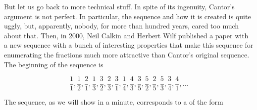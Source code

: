 \documentclass[tikz]{scrreprt}
\begin{document}
But let us go back to more technical stuff.
In spite of its ingenuity, Cantor's argument
is not perfect.
In particular, the sequence and how it is
created is quite uggly,
but, apparently, nobody, for more than hundred years,
cared too much about that. 
Then, in \num{2000}, Neil Calkin and Herbert Wilf
published a paper with a new sequence with 
a bunch of interesting properties that make
this sequence for enumerating the fractions
much more attractive than Cantor's original
sequence. The beginning of the sequence is

\[
 \frac{1}{1},
 \frac{1}{2}, 
 \frac{2}{1}, 
 \frac{1}{3}, 
 \frac{3}{2}, 
 \frac{2}{3}, 
 \frac{3}{1}, 
 \frac{1}{4}, 
 \frac{4}{3}, 
 \frac{3}{5}, 
 \frac{5}{2},
 \frac{2}{5},
 \frac{5}{3},
 \frac{3}{4},
 \frac{4}{1},
 \dots
\]

The sequence, as we will show in a minute,
corresponds to a  of the form
\end{document}
